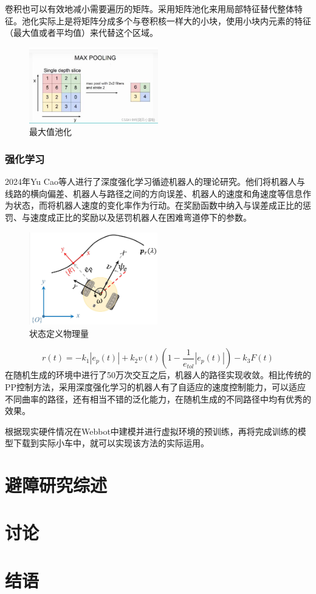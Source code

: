 \documentclass{paper}
\begin{document}
卷积也可以有效地减小需要遍历的矩阵。采用矩阵池化来用局部特征替代整体特征。池化实际上是将矩阵分成多个与卷积核一样大的小块，使用小块内元素的特征（最大值或者平均值）来代替这个区域。
\begin{figure}[ht]
  \centering
  \includegraphics[width=0.5\textwidth]{figures/pooling.png}
  \caption{最大值池化}
\end{figure}


\subsubsection{强化学习}
\label{subsec:label}
2024年Yu Cao等人进行了深度强化学习循迹机器人的理论研究\cite{cao2024path}。他们将机器人与线路的横向偏差、机器人与路径之间的方向误差、机器人的速度和角速度等信息作为状态，而将机器人速度的变化率作为行动。在奖励函数中纳入与误差成正比的惩罚、与速度成正比的奖励以及惩罚机器人在困难弯道停下的参数。

\begin{figure}[ht]
  \centering
  \includegraphics[width=0.5\textwidth]{figures/state.png}
  \caption{状态定义物理量\cite{cao2024path}}
\end{figure}

\[ r\left(t\right)=-k_{1}\left|e_{p}\left(t\right)\right|+k_{2}v\left(t\right)\left(1-\frac{1}{e_{tol}}\left|e_{p}\left(t\right)\right|\right)-k_{3}F\left(t\right) \]
在随机生成的环境中进行了50万次交互之后，机器人的路径实现收敛。相比传统的PP控制方法，采用深度强化学习的机器人有了自适应的速度控制能力，可以适应不同曲率的路径，还有相当不错的泛化能力，在随机生成的不同路径中均有优秀的效果。

根据现实硬件情况在Webbot中建模并进行虚拟环境的预训练，再将完成训练的模型下载到实际小车中，就可以实现该方法的实际运用。
\section{避障研究综述}
\label{sec:label}



\section{讨论}
\section{结语}




\end{document}
